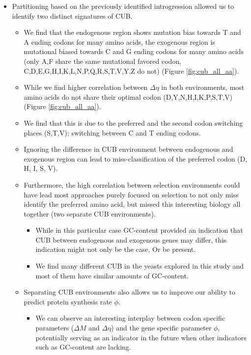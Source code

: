 \documentclass[12pt]{article}
\begin{document}
\begin{itemize}
	\item Partitioning \kluyveri based on the previously identified introgression allowed us to identify two distinct signatures of CUB.
	\begin{itemize}
		\item We find that the endogenous region shows mutation bias towards T and A ending codons for many amino acids, the exogenous region is mutational biased towards C and G ending codons for many amino acids (only A,F share the same mutational favored codon, C,D,E,G,H,I,K,L,N,P,Q,R,S,T,V,Y,Z do not) (Figure \ref{fig:cub_all_aa}).
		\item While we find higher correlation between $\Delta \eta$ in both environments, most amino acids do not share their optimal codon (D,Y,N,H,I,K,P,S,T,V) (Figure \ref{fig:cub_all_aa}).
		\item We find that this is due to the preferred and the second codon switching places (S,T,V);  switching between C and T ending codons.
		\item Ignoring the difference in CUB environment between endogenous and exogenous region can lead to miss-classification of the preferred codon (D, H, I, S, V).
		\item Furthermore, the high correlation between selection environments could have lead most approaches purely focused on selection to not only miss identify the preferred amino acid, but missed this interesting biology all together (two separate CUB environments).
		\begin{itemize}
			\item While in this particular case GC-content provided an indication that CUB between endogenous and exogenous genes may differ, this indication might not only be the case, Or be present.
			\item We find many different CUB in the yeasts explored in this study and most of them have similar amounts of GC-content.
		\end{itemize}
		\item Separating CUB environments also allows us to improve our ability to predict protein synthesis rate $\phi$.
		\begin{itemize}
			\item We can observe an interesting interplay between codon specific parameters ($\Delta M$ and $\Delta \eta$) and the gene specific parameter $\phi$, potentially serving as an indicator in the future when other indicators such as GC-content are lacking.

\end{itemize}
\end{itemize}
\end{itemize}
\end{document}
